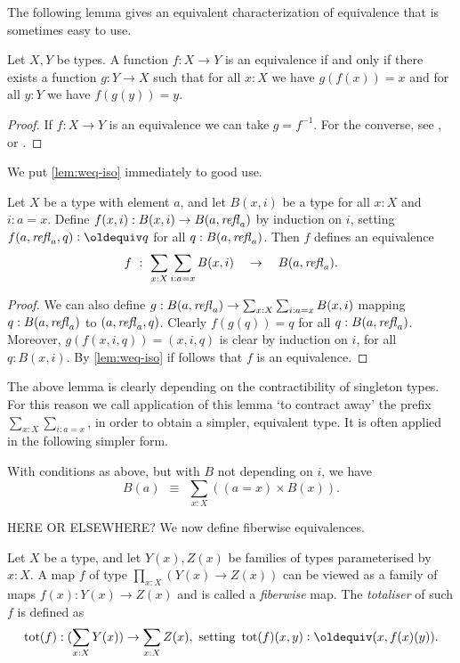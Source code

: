 The following lemma gives an equivalent characterization
of equivalence that is sometimes easy to use.

\begin{lemma}\label{lem:weq-iso}
Let $X,Y$ be types. A function $f: X\to Y$ is an equivalence
if and only if there exists a function $g: Y\to X$ such that
for all $x:X$ we have $g(f(x))=x$ and for all 
$y:Y$ we have $f(g(y))=y$.
\end{lemma}
\begin{proof}
If $f: X\to Y$ is an equivalence we can take $g=f^{-1}$.
For the converse, see
\cite[Chapter 4]{hottbook}, or .
\end{proof}

We put \cref{lem:weq-iso} immediately to good use.

\begin{lemma}\label{lem:contract-away}
Let $X$ be a type with element $a$, and let
$B(x,i)$ be a type for all $x:X$ and $i: a=x$.
Define $f(x,i): B(x,i) \to B(a,\mathop{{\it refl}_{a}})$ by induction on $i$,
setting $f(a,\refl{a},q) \defeq q$ for all $q:B(a,\mathop{{\it refl}_{a}})$.
Then $f$ defines an equivalence 
\[
f~:~ \sum_{x:X} \sum_{i: a=x} B(x,i) \quad \to \quad B(a,\mathop{{\it refl}_{a}}).
\]
\end{lemma}
\begin{proof}
We can also define 
$g: B(a,\mathop{{\it refl}_{a}})\to \sum_{x:X} \sum_{i: a=x} B(x,i)$
mapping $q: B(a,\mathop{{\it refl}_{a}})$ to $(a,\mathop{{\it refl}_{a}},q)$.
Clearly $f(g(q))=q$ for all $q:B(a,\mathop{{\it refl}_{a}})$.
Moreover, $g(f(x,i,q))=(x,i,q)$ is clear by induction
on $i$, for all $q:B(x,i)$.
By \cref{lem:weq-iso} if follows that $f$
is an equivalence.
\end{proof}

The above lemma is clearly depending on the 
contractibility of singleton types. For this reason
we call application of this lemma `to contract away'
the prefix $\sum_{x:X} \sum_{i: a=x}$, in order
to obtain a simpler, equivalent type. It is often applied
in the following simpler form.

\begin{corollary}\label{cor:contract-away}
With conditions as above, but with $B$ not depending on $i$, we have
\[
 B(a)~~\equiv~~\sum_{x:X} ((a=x)\times B(x)).
\]
\end{corollary}

HERE OR ELSEWHERE? We now define fiberwise equivalences.

\begin{definition}\label{def:fiberwise}
Let $X$ be a type, and let $Y(x),Z(x)$ be families of types parameterised
by $x:X$. A map $f$ of type $\prod_{x:X}(Y(x)\to Z(x))$
can be viewed as a family of maps $f(x): Y(x)\to Z(x)$ and is called a 
\emph{fiberwise} map. The \emph{totaliser} of such $f$ is defined as
\[
\tot(f) : (\sum_{x:X} Y(x)) \to \sum_{x:X} Z(x),
\text{ setting } \tot(f)(x,y)\defeq (x,f(x)(y)).
\]

\end{definition}

